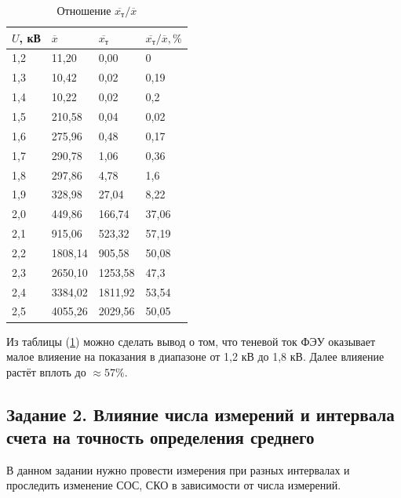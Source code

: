 \documentclass[a4paper,12pt]{article}
\begin{document}
\begin{table}[!ht]
    \centering
    \begin{tabular}{|l|l|l|l|}
    \hline
        $U$, кВ & $\overline{x}$ & $\overline{x_т}$ &  $\overline{x_т}/{\overline{x}}, \% $\\ \hline
        1,2 & 11,20 & 0,00 & 0 \\ \hline
        1,3 & 10,42 & 0,02 & 0,19 \\ \hline
        1,4 & 10,22 & 0,02 & 0,2 \\ \hline
        1,5 & 210,58 & 0,04 & 0,02 \\ \hline
        1,6 & 275,96 & 0,48 & 0,17 \\ \hline
        1,7 & 290,78 & 1,06 & 0,36 \\ \hline
        1,8 & 297,86 & 4,78 & 1,6 \\ \hline
        1,9 & 328,98 & 27,04 & 8,22 \\ \hline
        2,0 & 449,86 & 166,74 & 37,06 \\ \hline
        2,1 & 915,06 & 523,32 & 57,19 \\ \hline
        2,2 & 1808,14 & 905,58 & 50,08 \\ \hline
        2,3 & 2650,10 & 1253,58 & 47,3 \\ \hline
        2,4 & 3384,02 & 1811,92 & 53,54 \\ \hline
        2,5 & 4055,26 & 2029,56 & 50,05 \\ \hline
    \end{tabular}
    \caption{Отношение $\overline{x_т}/{\overline{x}}$}
    \label{xtx}
\end{table}

Из таблицы (\ref{xtx}) можно сделать вывод о том, что теневой ток ФЭУ оказывает малое влияение на показания в диапазоне от 1,2 кВ до 1,8 кВ. Далее влияение растёт вплоть до $\approx 57\%$. 

\clearpage

\subsection{Задание 2. Влияние числа измерений и интервала счета
на точность определения среднего}
\hspace{\parindent} В данном задании нужно провести измерения при разных интервалах и проследить изменение СОС, СКО в зависимости от числа измерений.
\end{document}
